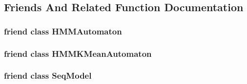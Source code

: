 \subsection{Friends And Related Function Documentation}
\hypertarget{class_k_mean_state_a3f73063e67c75773ba856636249277b6}{
\subsubsection[{H\+M\+M\+Automaton}]{\setlength{\rightskip}{0pt plus 5cm}friend class {\bf H\+M\+M\+Automaton}\hspace{0.3cm}{\ttfamily [friend]}}}\label{class_k_mean_state_a3f73063e67c75773ba856636249277b6}
\hypertarget{class_k_mean_state_ab26b380e0dac284d048154f52162b931}{
\subsubsection[{H\+M\+M\+K\+Mean\+Automaton}]{\setlength{\rightskip}{0pt plus 5cm}friend class {\bf H\+M\+M\+K\+Mean\+Automaton}\hspace{0.3cm}{\ttfamily [friend]}}}\label{class_k_mean_state_ab26b380e0dac284d048154f52162b931}
\hypertarget{class_k_mean_state_a1b622e128d992231899ba78ca9c72507}{
\subsubsection[{Seq\+Model}]{\setlength{\rightskip}{0pt plus 5cm}friend class {\bf Seq\+Model}\hspace{0.3cm}{\ttfamily [friend]}}}\label{class_k_mean_state_a1b622e128d992231899ba78ca9c72507}


